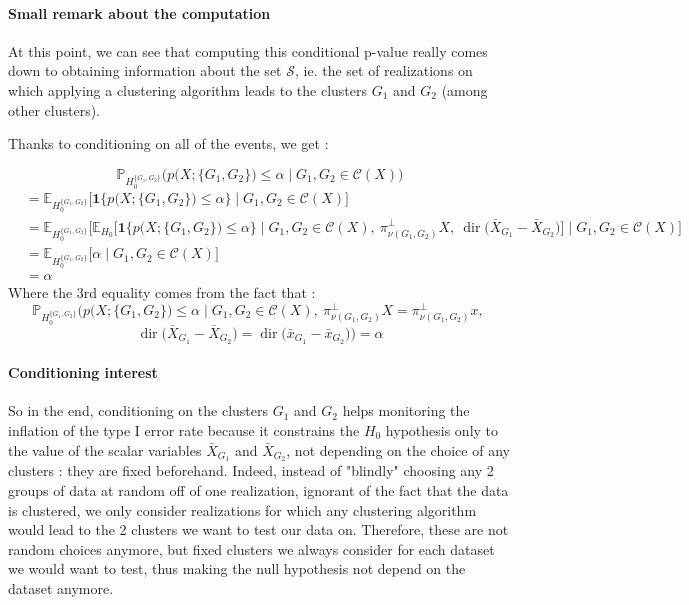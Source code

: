 \documentclass[11pt,a4paper]{article}
\begin{document}
\paragraph{Small remark about the computation} At this point, we can see that computing this conditional p-value really comes down to obtaining information about the set $\mathcal{S}$, ie. the set of realizations on which applying a clustering algorithm leads to the clusters $G_1$ and $G_2$ (among other clusters).

Thanks to conditioning on all of the events, we get :

\[
\mathbb{P}_{H_0^{\{G_1,G_2\}}}\Big(p\big(X;\{G_1,G_2\}\big) \le \alpha \;\Big|\; G_1,G_2 \in \mathcal{C}(X)\Big)
\]
\begin{align*}
&= \mathbb{E}_{H_0^{\{G_1,G_2\}}}\Big[\mathbf{1}\big\{p\big(X;\{G_1,G_2\}\big) \le \alpha\big\} \;\Big|\; G_1,G_2 \in \mathcal{C}(X)\Big] \\
&= \mathbb{E}_{H_0^{\{G_1,G_2\}}}\Big[\mathbb{E}_{H_0}\Big[\mathbf{1}\big\{p\big(X;\{G_1,G_2\}\big) \le \alpha\big\} \;\Big|\; G_1,G_2 \in \mathcal{C}(X),\ \pi^{\perp}_{\nu(G_1,G_2)}X,\ \operatorname{dir}\big(\bar X_{G_1}-\bar X_{G_2}\big)\Big] \;\Big|\; G_1,G_2 \in \mathcal{C}(X)\Big] \\
&= \mathbb{E}_{H_0^{\{G_1,G_2\}}}\Big[\alpha \;\Big|\; G_1,G_2 \in \mathcal{C}(X)\Big] \\
&= \alpha
\end{align*}
Where the 3rd equality comes from the fact that :
\[
\mathbb{P}_{H_0^{\{G_1,G_2\}}}\Big(p\big(X;\{G_1,G_2\}\big) \le \alpha \;\Big|\; G_1,G_2 \in \mathcal{C}(X),\ \pi^{\perp}_{\nu(G_1,G_2)}X = \pi^{\perp}_{\nu(G_1,G_2)}x,\ \]
\[\operatorname{dir}\big(\bar X_{G_1}-\bar X_{G_2}\big) = \operatorname{dir}\big(\bar x_{G_1}-\bar x_{G_2}\big)\Big) = \alpha
\]

\paragraph{Conditioning interest} So in the end, conditioning on the clusters $G_1$ and $G_2$ helps monitoring the inflation of the type I error rate because it constrains the $H_0$ hypothesis only to the value of the scalar variables $\bar{X}_{G_1}$ and $\bar{X}_{G_2}$, not depending on the choice of any clusters : they are fixed beforehand. Indeed, instead of "blindly" choosing  any 2 groups of data at random off of one realization, ignorant of the fact that the data is clustered, we only consider realizations for which any clustering algorithm would lead to the 2 clusters we want to test our data on. Therefore, these are not random choices anymore, but fixed clusters we always consider for each dataset we would want to test, thus making the null hypothesis not depend on the dataset anymore. 
\end{document}
